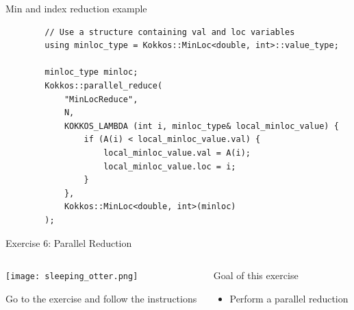 \documentclass[aspectratio=169]{beamer}
\begin{document}

\begin{frame}[fragile]{Min and index reduction example}
    \begin{verbatim}
        // Use a structure containing val and loc variables
        using minloc_type = Kokkos::MinLoc<double, int>::value_type;

        minloc_type minloc;
        Kokkos::parallel_reduce(
            "MinLocReduce",
            N,
            KOKKOS_LAMBDA (int i, minloc_type& local_minloc_value) {
                if (A(i) < local_minloc_value.val) {
                    local_minloc_value.val = A(i);
                    local_minloc_value.loc = i;
                }
            },
            Kokkos::MinLoc<double, int>(minloc)
        );
    \end{verbatim}
\end{frame}


\begin{exerciseframe}{Exercise 6: Parallel Reduction}
    \begin{columns}
        \begin{column}{0.5\linewidth}
            \begin{center}
                \texttt{[image: sleeping\_otter.png]}
            \end{center}

            Go to the exercise  and follow the instructions
        \end{column}
        \begin{column}{0.5\linewidth}
            \begin{block}{Goal of this exercise}
                \begin{itemize}
                    \item Perform a parallel reduction
                \end{itemize}
            \end{block}
        \end{column}
    \end{columns}
\end{exerciseframe}

\end{document}
